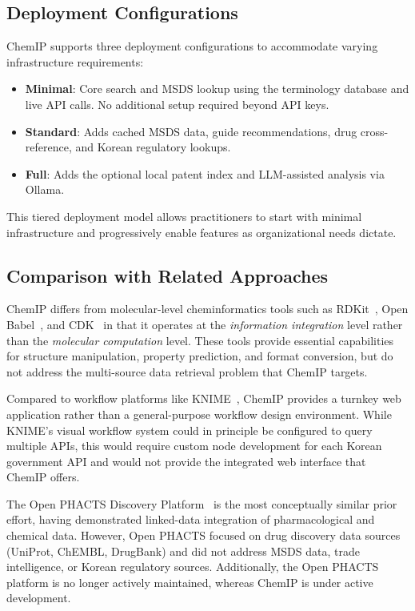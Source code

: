 \documentclass[10pt]{article}
\begin{document}
\subsection{Deployment Configurations}

ChemIP supports three deployment configurations to accommodate varying infrastructure requirements:
\begin{itemize}[nosep]
  \item \textbf{Minimal}: Core search and MSDS lookup using the terminology database and live API calls. No additional setup required beyond API keys.
  \item \textbf{Standard}: Adds cached MSDS data, guide recommendations, drug cross-reference, and Korean regulatory lookups.
  \item \textbf{Full}: Adds the optional local patent index and LLM-assisted analysis via Ollama.
\end{itemize}

This tiered deployment model allows practitioners to start with minimal infrastructure and progressively enable features as organizational needs dictate.

\subsection{Comparison with Related Approaches}

ChemIP differs from molecular-level cheminformatics tools such as RDKit~\cite{rdkit}, Open Babel~\cite{openbabel}, and CDK~\cite{cdk} in that it operates at the \emph{information integration} level rather than the \emph{molecular computation} level.
These tools provide essential capabilities for structure manipulation, property prediction, and format conversion, but do not address the multi-source data retrieval problem that ChemIP targets.

Compared to workflow platforms like KNIME~\cite{knime}, ChemIP provides a turnkey web application rather than a general-purpose workflow design environment.
While KNIME's visual workflow system could in principle be configured to query multiple APIs, this would require custom node development for each Korean government API and would not provide the integrated web interface that ChemIP offers.

The Open PHACTS Discovery Platform~\cite{openphacts} is the most conceptually similar prior effort, having demonstrated linked-data integration of pharmacological and chemical data.
However, Open PHACTS focused on drug discovery data sources (UniProt, ChEMBL, DrugBank) and did not address MSDS data, trade intelligence, or Korean regulatory sources.
Additionally, the Open PHACTS platform is no longer actively maintained, whereas ChemIP is under active development.
\end{document}
